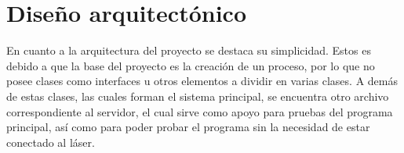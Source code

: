 \section{Diseño arquitectónico}

En cuanto a la arquitectura del proyecto se destaca su simplicidad. Estos es debido a que la base del proyecto es la creación de un proceso, por lo que no posee clases como interfaces u otros elementos a dividir en varias clases.
A demás de estas clases, las cuales forman el sistema principal, se encuentra otro archivo correspondiente al servidor, el cual sirve como apoyo para pruebas del programa principal, así como para poder probar el programa sin la necesidad de estar conectado al láser.
